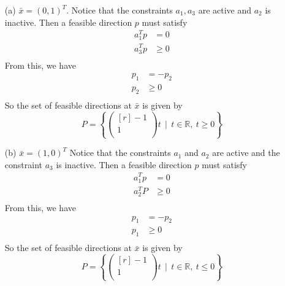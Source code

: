 \documentclass{article}
\begin{document}
    \begin{itemize}
        \item[(a)] $\bar{x} = (0,1)^T$. 
        \newline\newline
        Notice that the constraints $a_1, a_3$ are active and $a_2$ is inactive. Then a feasible direction $p$ must satisfy
        \begin{align*}
            a_1^Tp &= 0\\
            a_3^Tp &\geq 0\\
        \end{align*}
        From this, we have
        \begin{align*}
            p_1 &= -p_2 \\
            p_2 &\geq 0\\
        \end{align*}
        So the set of feasible directions at $\bar{x}$ is given by
        \[P = \left\{\begin{pmatrix*}[r]
            -1\\
            1\\
        \end{pmatrix*}t \:\: \bigg| \:\: t \in \mathbb{R}, \: t \geq 0\right\}\]

        \item[(b)] $\bar{x} = (1,0)^T$
        \newline\newline
        Notice that the constraints $a_1$ and $a_2$ are active and the constraint $a_3$ is inactive. Then a feasible direction $p$ must satisfy
        \begin{align*}
            a_1^Tp &= 0\\
            a_2^TP &\geq 0\\
        \end{align*}
        From this, we have
        \begin{align*}
            p_1 &= -p_2 \\
            p_1 &\geq 0\\
        \end{align*}
        So the set of feasible directions at $\bar{x}$ is given by
        \[P = \left\{\begin{pmatrix*}[r]
            -1\\
            1\\
        \end{pmatrix*}t \:\: \bigg| \:\: t \in \mathbb{R}, \: t \leq 0\right\}\]


\end{itemize}
\end{document}

